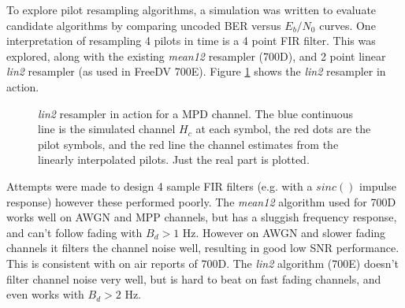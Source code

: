 \documentclass{article}
\begin{document}
To explore pilot resampling algorithms, a simulation was written to evaluate candidate algorithms by comparing uncoded BER versus $E_b/N_0$ curves.  One interpretation of resampling 4 pilots in time is a 4 point FIR filter. This was explored, along with the existing \emph{mean12} resampler (700D), and 2 point linear \emph{lin2} resampler (as used in FreeDV 700E). Figure \ref{fig:interpolator} shows the \emph{lin2} resampler in action.

\begin{figure}[h]
\caption{\emph{lin2} resampler in action for a MPD channel. The blue continuous line is the simulated channel $H_c$ at each symbol, the red dots are the pilot symbols, and the red line the channel estimates from the linearly interpolated pilots.  Just the real part is plotted.}
\label{fig:interpolator}
\begin{center}

\end{center}
\end{figure}

Attempts were made to design 4 sample FIR filters (e.g. with a $sinc()$ impulse response) however these performed poorly. The \emph{mean12} algorithm used for 700D works well on AWGN and MPP channels, but has a sluggish frequency response, and can't follow fading with $B_d>1$ Hz.  However on AWGN and slower fading channels it filters the channel noise well, resulting in good low SNR performance.  This is consistent with on air reports of 700D. The \emph{lin2} algorithm (700E) doesn't filter channel noise very well, but is hard to beat on fast fading channels, and even works with $B_d>2$ Hz.
\end{document}
